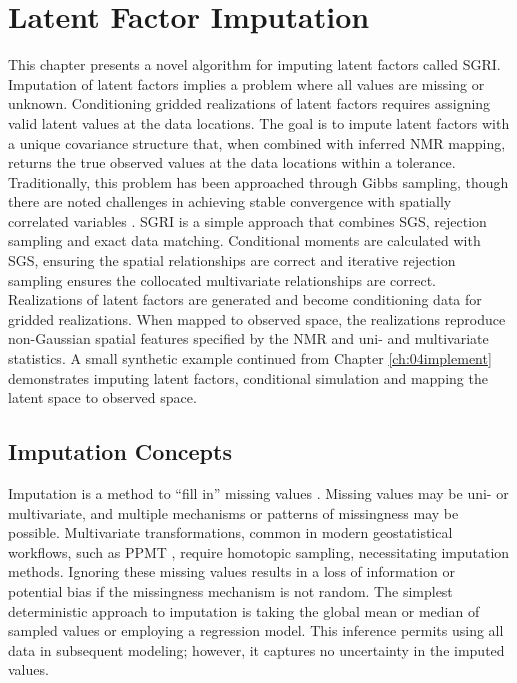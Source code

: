 
\chapter{Latent Factor Imputation}
\label{ch:05impute}

This chapter presents a novel algorithm for imputing latent factors called \gls{SGRI}. Imputation of latent factors implies a problem where all values are missing or unknown. Conditioning gridded realizations of latent factors requires assigning valid latent values at the data locations. The goal is to impute latent factors with a unique covariance structure that, when combined with inferred \gls{NMR} mapping, returns the true observed values at the data locations within a tolerance. Traditionally, this problem has been approached through Gibbs sampling, though there are noted challenges in achieving stable convergence with spatially correlated variables \citep{silva2018enhanced}. \gls{SGRI} is a simple approach that combines \gls{SGS}, rejection sampling and exact data matching. Conditional moments are calculated with \gls{SGS}, ensuring the spatial relationships are correct and iterative rejection sampling ensures the collocated multivariate relationships are correct. Realizations of latent factors are generated and become conditioning data for gridded realizations. When mapped to observed space, the realizations reproduce non-Gaussian spatial features specified by the \gls{NMR} and uni- and multivariate statistics. A small synthetic example continued from Chapter \ref{ch:04implement} demonstrates imputing latent factors, conditional simulation and mapping the latent space to observed space.

\FloatBarrier
\section{Imputation Concepts}
\label{sec:05imputation}

Imputation is a method to ``fill in'' missing values \citep{little2019statistical}. Missing values may be uni- or multivariate, and multiple mechanisms or patterns of missingness may be possible. Multivariate transformations, common in modern geostatistical workflows, such as \gls{PPMT} \citep{barnett2014projection}, require homotopic sampling, necessitating imputation methods. Ignoring these missing values results in a loss of information or potential bias if the missingness mechanism is not random. The simplest deterministic approach to imputation is taking the global mean or median of sampled values or employing a regression model. This inference permits using all data in subsequent modeling; however, it captures no uncertainty in the imputed values.

